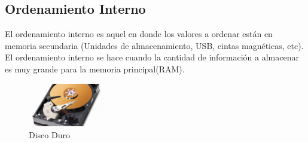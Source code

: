 \documentclass[12pt, a4paper]{article}
\begin{document}
\subsection{Ordenamiento Interno}\label{sec:OrdenInterno}
El ordenamiento interno es aquel en donde  los valores a ordenar están en memoria secundaria (Unidades de almacenamiento, USB, cintas magnéticas, etc). El ordenamiento interno se hace cuando la cantidad de información a almacenar es muy grande para la memoria principal(RAM).
\begin{figure}[h]
    \centering
    \includegraphics[width=0.3\textwidth]{Imagenes/disco_duro-1280x720.jpg}
    \caption{Disco Duro}
    \label{fig:discoDuro}
\end{figure}
\end{document}
